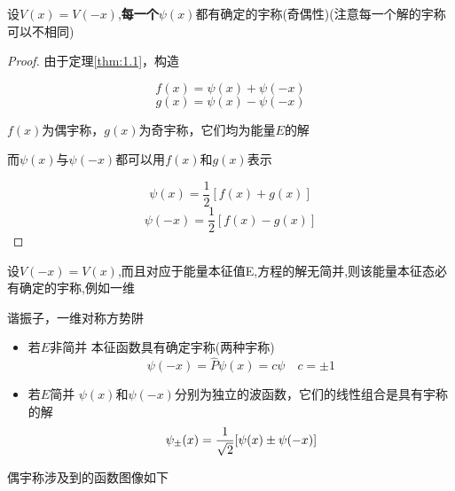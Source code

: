 \documentclass{article}
\begin{document}
        \begin{thm}\label{thm:1.2}
            \thmindent
            
            设$V(x)=V(-x)$,\textbf{每一个}$\psi(x)$都有确定的宇称(奇偶性)(注意每一个解的宇称可以不相同)
            
            \begin{proof}
                \pfindent
                
                由于定理\ref{thm:1.1}，构造 
                   
                    $$ f(x) = \psi(x)+\psi(-x) $$                          %
                    $$ g(x) = \psi(x)-\psi(-x) $$
                
                $f(x)$为偶宇称，$g(x)$为奇宇称，它们均为能量$E$的解       \par  %
                而$\psi(x)$与$\psi(-x)$都可以用$f(x)$和$g(x)$表示    

                $$ \psi(x) = \frac{1}{2} [f(x)+g(x)]  $$
                $$ \psi(-x) = \frac{1}{2} [f(x)-g(x)] $$    

           \end{proof}
           
           \begin{corollary}\label{cl:1}
                \clindent 
                
                设$V(-x) = V(x)$,而且对应于能量本征值E,方程的解无简并,则该能量本征态必有确定的宇称,例如一维 \par
                谐振子，一维对称方势阱
                
                \begin{itemize}
                    \item 若$E$非简并  \quad 本征函数具有确定宇称(两种宇称) 
                        $$ \psi(-x) = \hat{P}\psi(x) = c\psi \quad c=\pm 1 $$ %
                    \item 若$E$简并 \quad $\psi(x)$和$\psi(-x)$分别为独立的波函数，它们的线性组合是具有宇称的解
                        $$ \psi_{\pm} (x) = \frac{1}{\sqrt{2}}[\psi(x) \pm \psi(-x)] $$
                \end{itemize}
            
           \end{corollary}

        \end{thm}
        \par
        偶宇称涉及到的函数图像如下
\end{document}
